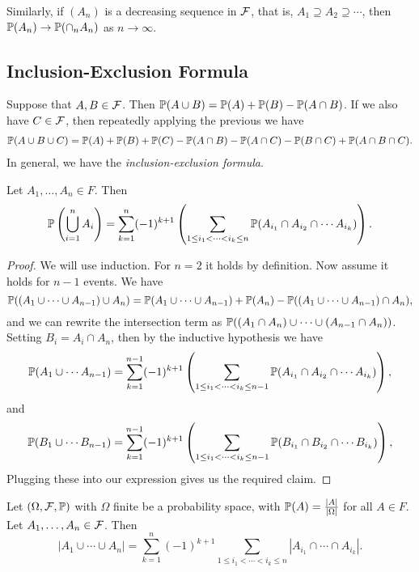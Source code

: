 \documentclass[a4paper]{scrreprt}
\begin{document}
Similarly, if $(A_n)$ is a decreasing sequence in $\mathcal{F}$, that is, $A_1 \supseteq A_2 \supseteq \cdots$, then $\mathbb{P}(A_n) \rightarrow \mathbb{P}(\cap_n A_n)$ as $n \rightarrow \infty$.

\subsection{Inclusion-Exclusion Formula}

Suppose that $A, B \in \mathcal{F}$. Then $\mathbb{P}(A \cup B) = \mathbb{P}(A) + \mathbb{P}(B) - \mathbb{P}(A \cap B)$. If we also have $C \in \mathcal{F}$, then repeatedly applying the previous we have
\begin{align*}
	\mathbb{P}(A \cup B \cup C) = \mathbb{P}(A) + \mathbb{P}(B) + \mathbb{P}(C) - \mathbb{P}(A \cap B) - \mathbb{P}(A \cap C) - \mathbb{P}(B \cap C) + \mathbb{P}(A \cap B \cap C).
\end{align*}
In general, we have the \emph{inclusion-exclusion formula}.

\begin{proposition}
	Let $A_1, \dots, A_n \in F$. Then
	$$
	\mathbb{P}\left(\bigcup_{i = 1}^n A_i\right) 
	= \sum_{k = 1}^{n} (-1)^{k + 1} \left(\sum_{1 \leq i_1 < \cdots < i_k \leq n} \mathbb{P}(A_{i_1} \cap A_{i_2} \cap \cdots A_{i_k})\right).
	$$
\end{proposition}
\begin{proof}
	We will use induction. For $n = 2$ it holds by definition. Now assume it holds for $n - 1$ events. We have
	$$
	\mathbb{P}((A_1 \cup \cdots \cup A_{n-1}) \cup A_n) = \mathbb{P}(A_1 \cup \cdots \cup A_{n-1}) + \mathbb{P}(A_n) - \mathbb{P}((A_1 \cup \cdots \cup A_{n-1}) \cap A_n),
	$$
	and we can rewrite the intersection term as $\mathbb{P}((A_1 \cap A_n) \cup \cdots \cup (A_{n - 1} \cap A_n))$. Setting $B_i = A_i \cap A_n$, then by the inductive hypothesis we have
	$$
	\mathbb{P}(A_1 \cup \cdots A_{n - 1}) = \sum_{k = 1}^{n-1} (-1)^{k + 1} \left(\sum_{1 \leq i_1 < \cdots < i_k \leq n-1} \mathbb{P}(A_{i_1} \cap A_{i_2} \cap \cdots A_{i_k})\right),
	$$
	and
	$$
	\mathbb{P}(B_1 \cup \cdots B_{n - 1}) = \sum_{k = 1}^{n-1} (-1)^{k + 1} \left(\sum_{1 \leq i_1 < \cdots < i_k \leq n-1} \mathbb{P}(B_{i_1} \cap B_{i_2} \cap \cdots B_{i_k})\right),
	$$
	Plugging these into our expression gives us the required claim.
\end{proof}

Let $(\Omega, \mathcal{F}, \mathbb{P})$ with $\Omega$ finite be a probability space, with $\mathbb{P}(A) = \frac{|A|}{|\Omega|}$ for all $A \in F$. Let $A_1, \dots, A_n \in \mathcal{F}$. Then
$$
|A_1 \cup \cdots \cup A_n| = \sum_{k = 1}^n (-1)^{k + 1} \sum_{1 \leq i_1 < \cdots < i_k \leq n} |A_{i_1} \cap \cdots \cap A_{i_k}|.
$$
\end{document}
